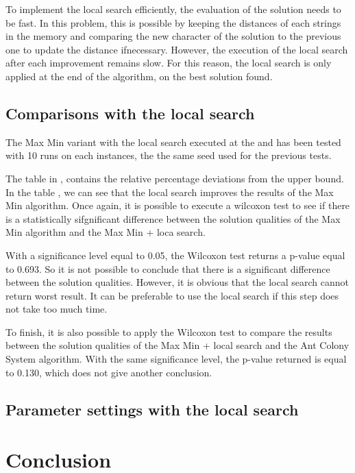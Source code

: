 \documentclass{article}
\begin{document}
To implement the local search efficiently, the evaluation of the solution needs to be fast.
In this problem, this is possible by keeping the distances of each strings in the memory and comparing the new character of the solution to the previous one to update the distance ifnecessary.
However, the execution of the local search after each improvement remains slow.
For this reason, the local search is only applied at the end of the algorithm, on the best solution found.

\subsection{Comparisons with the local search}

The Max Min variant with the local search executed at the and has been tested with 10 runs on each instances, the the same seed used for the previous tests.

The table in \cite{app:rpd}, contains the relative percentage deviations from the upper bound.
In the table \cite{app:rpdsum}, we can see that the local search improves the results of the Max Min algorithm.
Once again, it is possible to execute a wilcoxon test to see if there is a statistically sifgnificant difference between the solution qualities of the Max Min algorithm and the Max Min + loca search. \newline

With a significance level equal to 0.05, the Wilcoxon test returns a p-value equal to 0.693.
So it is not possible to conclude that there is a significant difference between the solution qualities.
However, it is obvious that the local search cannot return worst result.
It can be preferable to use the local search if this step does not take too much time. \newline

To finish, it is also possible to apply the Wilcoxon test to compare the results between the solution qualities of the Max Min + local search and the Ant Colony System algorithm.
With the same significance level, the p-value returned is equal to 0.130, which does not give another conclusion.

\subsection{Parameter settings with the local search}

\section*{Conclusion}
\end{document}
